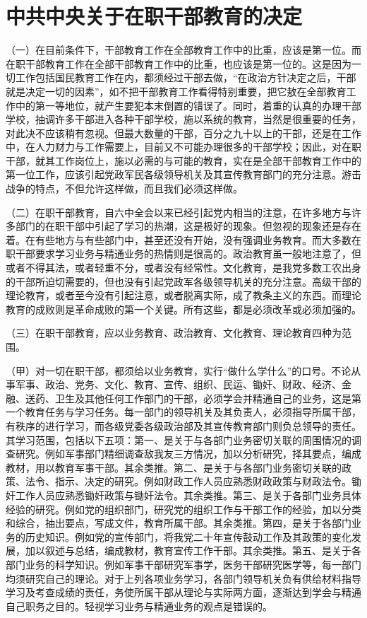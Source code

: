 \section[中共中央关于在职干部教育的决定（一九四二年二月二十八日）]{中共中央关于在职干部教育的决定}


（一）在目前条件下，干部教育工作在全部教育工作中的比重，应该是第一位。而在职干部教育工作在全部干部教育工作中的比重，也应该是第一位的。这是因为一切工作包括国民教育工作在内，都须经过干部去做，“在政治方针决定之后，干部就是决定一切的因素”，如不把干部教育工作看得特别重要，把它敖在全部教育工作中的第一等地位，就产生要犯本末倒置的错误了。同时，着重的认真的办理干部学校，抽调许多干部进入各种干部学校，施以系统的教育，当然是很重要的任务，对此决不应该稍有忽视。但最大数量的干部，百分之九十以上的干部，还是在工作中，在人力财力与工作需要上，目前又不可能办理很多的干部学校；因此，对在职干部，就其工作岗位上，施以必需的与可能的教育，实在是全部干部教育工作中的第一位工作，应该引起党政军民各级领导机关及其宣传教育部门的充分注意。游击战争的特点，不但允许这样做，而且我们必须这样做。

（二）在职干部教育，自六中全会以来已经引起党内相当的注意，在许多地方与许多部门的在职干部中引起了学习的热潮，这是极好的现象。但忽视的现象还是存在着。在有些地方与有些部门中，甚至还没有开始，没有强调业务教育。而大多数在职干部要求学习业务与精通业务的热情则是很高的。政治教育虽一般地注意了，但或者不得其法，或者轻重不分，或者没有经常性。文化教育，是我党多数工农出身的干部所迫切需要的，但也没有引起党政军各级领导机关的充分注意。高级干部的理论教育，或者至今没有引起注意，或者脱离实际，成了教条主义的东西。而理论教育的成败则是革命成败的第一个关键。所有这些，都是必须改革或必须加强的。

（三）在职干部教育，应以业务教育、政治教育、文化教育、理论教育四种为范围。

（甲）对一切在职干部，都须给以业务教育，实行“做什么学什么”的口号。不论从事军事、政治、党务、文化、教育、宣传、组织、民运、锄奸、财政、经济、金融、送药、卫生及其他任何工作部门的干部，必须学会并精通自己的业务，这是第一个教育任务与学习任务。每一部门的领导机关及其负责人，必须指导所属干部，有秩序的进行学习，而各级党委各级政治部及其宣传教育部门则负总领导的责任。其学习范围，包括以下五项：第一、是关于与各部门业务密切关联的周围情况的调查研究。例如军事部门精细调查敌我友三方情况，加以分析研究，择其要点，编成教材，用以教育军事干部。其余类推。第二、是关于与各部门业务密切关联的政策、法令、指示、决定的研究。例如财政工作人员应熟悉财政政策与财政法令。锄奸工作人员应熟悉锄奸政策与锄奸法令。其余类推。第三、是关于各部门业务具体经验的研究。例如党的组织部门，研究党的组织工作与干部工作的经验，加以分类和综合，抽出要点，写成文件，教育所属干部。其余类推。第四，是关于各部门业务的历史知识。例如党的宣传部门，将我党二十年宣传鼓动工作及其政策的变化发展，加以叙述与总结，编成教材，教育宣传工作干部。其余类推。第五、是关于各部门业务的科学知识。例如军事干部研究军事学，医务干部研究医学等，每一部门均须研究自己的理论。对于上列各项业务学习，各部门领导机关负有供给材料指导学习及考查成绩的责任，务使所属干部从理论与实际两方面，逐渐达到学会与精通自己职务之目的。轻视学习业务与精通业务的观点是错误的。

